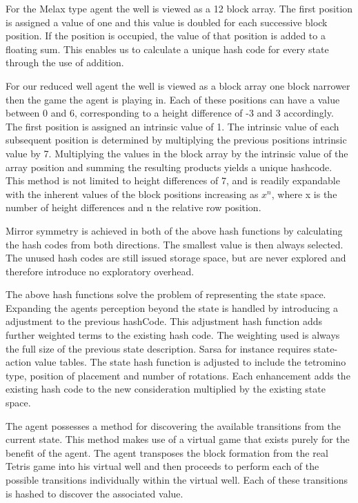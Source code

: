 \documentclass{rucsthesis}
\begin{document}
For the Melax type agent the well is viewed as a 12 block array. The first position is assigned a value of one and this value is doubled for each successive block position. If the position is occupied, the value of that position is added to a floating sum. This enables us to calculate a unique hash code for every state through the use of addition.

For our reduced well agent the well is viewed as a block array one block narrower then the game the agent is playing in. Each of these positions can have a value between 0 and 6, corresponding to a height difference of -3 and 3 accordingly. The first position is assigned an intrinsic value of 1. The intrinsic value of each subsequent position is determined by multiplying the previous positions intrinsic value by 7. Multiplying the values in the block array by the intrinsic value of the array position and summing the resulting products yields a unique hashcode. This method is not limited to height differences of 7, and is readily expandable with the inherent values of the block positions increasing as $x^n$, where x is the number of height differences and n the relative row position.

Mirror symmetry is achieved in both of the above hash functions by calculating the hash codes from both directions. The smallest value is then always selected. The unused hash codes are still issued storage space, but are never explored and therefore introduce no exploratory overhead.

The above hash functions solve the problem of representing the state space. Expanding the agents perception beyond the state is handled by introducing a adjustment to the previous hashCode. This adjustment hash function adds further weighted terms to the existing hash code. The weighting used is always the full size of the previous state description. Sarsa for instance requires state-action value tables. The state hash function is adjusted to include the tetromino type, position of placement and number of rotations. Each enhancement adds the existing hash code to the new consideration multiplied by the existing state space. 

The agent possesses a method for discovering the available transitions from the current state. This method makes use of a virtual game that exists purely for the benefit of the agent. The agent transposes the block formation from the real Tetris game into his virtual well and then proceeds to perform each of the possible transitions individually within the virtual well. Each of these transitions is hashed to discover the associated value.    
\end{document}
